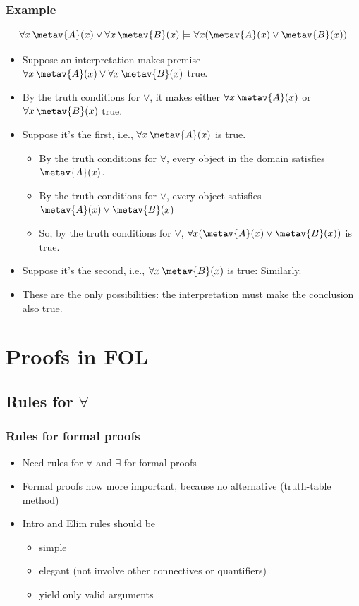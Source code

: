 \begin{frame}
  \frametitle{Example}

  \[\forall x\,\metav{A}(x) \lor \forall x\,\metav{B}(x) \models \forall x(\metav{A}(x) \lor \metav{B}(x))\]
  \begin{itemize}[<+->]
  \item Suppose an interpretation makes premise $\forall x\,\metav{A}(x)
  \lor \forall x\,\metav{B}(x)$ true.
  \item By the truth conditions for $\lor$, it makes either $\forall x\,\metav{A}(x)$ or $\forall
  x\,\metav{B}(x)$ true.
  \item Suppose it's the first, i.e., $\forall x\,\metav{A}(x)$ is true.
    \begin{itemize}[<+->]
      \item By the truth conditions for $\forall$, every object in the domain satisfies $\metav{A}(x)$.
      \item By the truth conditions for $\lor$, every object satisfies $\metav{A}(x) \lor \metav{B}(x)$
      \item So, by the truth conditions for $\forall$, $\forall x(\metav{A}(x)
      \lor \metav{B}(x))$ is true.
    \end{itemize}
  \item Suppose it's the second, i.e., $\forall
  x\,\metav{B}(x)$ is true: Similarly.
  \item These are the only possibilities: the interpretation must make the conclusion also true.
  \end{itemize}
\end{frame}

\newhourlecture
\newonlinelecture

\section{Proofs in FOL}

\subsection{Rules for $\forall$}

\begin{frame}
\frametitle{Rules for formal proofs}

\begin{itemize}[<+->]
\item Need rules for $\forall$ and $\exists$ for formal proofs
\item Formal proofs now more important, because no alternative
  (truth-table method)
\item Intro and Elim rules should be
\begin{itemize}[<+->]
\item simple
\item elegant (not involve other connectives or quantifiers)
\item yield only valid arguments
\end{itemize}
\end{itemize}

\end{frame}

